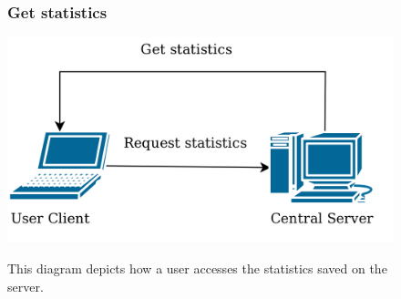 \begin{figure}
  \subsubsection{Get statistics}
  \centering
  \includegraphics[width=0.5\linewidth]{./system/systemmodel/images/statistics.png}
  \label{statistics}
  \caption{This diagram depicts how a user accesses the statistics saved on the server.}
\end{figure}
